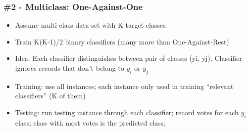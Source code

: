 \begin{frame}[fragile]\frametitle{\#2 - Multiclass: One-Against-One}
\begin{itemize}
\item Assume multi-class data-set with K target classes
\item Train K(K-1)/2 binary classifiers (many more than One-Against-Rest)
\item Idea: Each classifier distinguishes between pair of classes (yi, yj); Classifier ignores records that don't belong to $y_i$ or $y_j$
\item Training: use all instances; each instance only used in training ``relevant classifiers'' (K of them)
\item Testing:
run testing instance through each classifier;
record votes for each $y_i$ class;
class with most votes is the predicted class;
\end{itemize}
\end{frame}
%



